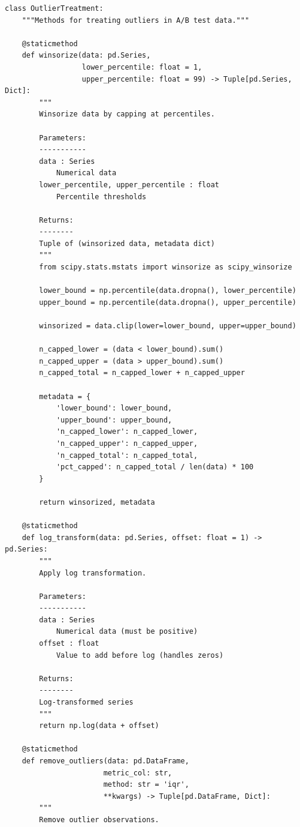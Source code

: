 \lstset{language=Python, caption=Outlier Treatment Methods}
\begin{lstlisting}
class OutlierTreatment:
    """Methods for treating outliers in A/B test data."""

    @staticmethod
    def winsorize(data: pd.Series,
                  lower_percentile: float = 1,
                  upper_percentile: float = 99) -> Tuple[pd.Series, Dict]:
        """
        Winsorize data by capping at percentiles.

        Parameters:
        -----------
        data : Series
            Numerical data
        lower_percentile, upper_percentile : float
            Percentile thresholds

        Returns:
        --------
        Tuple of (winsorized data, metadata dict)
        """
        from scipy.stats.mstats import winsorize as scipy_winsorize

        lower_bound = np.percentile(data.dropna(), lower_percentile)
        upper_bound = np.percentile(data.dropna(), upper_percentile)

        winsorized = data.clip(lower=lower_bound, upper=upper_bound)

        n_capped_lower = (data < lower_bound).sum()
        n_capped_upper = (data > upper_bound).sum()
        n_capped_total = n_capped_lower + n_capped_upper

        metadata = {
            'lower_bound': lower_bound,
            'upper_bound': upper_bound,
            'n_capped_lower': n_capped_lower,
            'n_capped_upper': n_capped_upper,
            'n_capped_total': n_capped_total,
            'pct_capped': n_capped_total / len(data) * 100
        }

        return winsorized, metadata

    @staticmethod
    def log_transform(data: pd.Series, offset: float = 1) -> pd.Series:
        """
        Apply log transformation.

        Parameters:
        -----------
        data : Series
            Numerical data (must be positive)
        offset : float
            Value to add before log (handles zeros)

        Returns:
        --------
        Log-transformed series
        """
        return np.log(data + offset)

    @staticmethod
    def remove_outliers(data: pd.DataFrame,
                       metric_col: str,
                       method: str = 'iqr',
                       **kwargs) -> Tuple[pd.DataFrame, Dict]:
        """
        Remove outlier observations.


\end{lstlisting}
